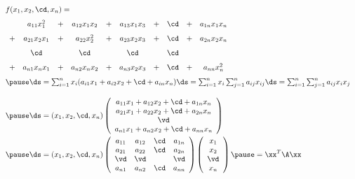 \begin{frame}
  \begin{footnotesize}
    $$
    \begin{array}{l}
      f(x_1,x_2,\cd,x_n) =  \\[0.1in]
      \begin{array}{rcccccccccc}
        &a_{11}x_1^2&+&a_{12}x_1x_2&+&a_{13}x_1x_3&+&\cd&+&a_{1n}x_1x_n\\[0.1in]
        +&a_{21}x_2x_1&+&a_{22}x_2^2&+&a_{23}x_2x_3&+&\cd&+&a_{2n}x_2x_n\\[0.1in]
        &\cd&&\cd&&\cd&&\cd\\[0.1in]
        +&a_{n1}x_nx_1&+&a_{n2}x_nx_2&+&a_{n3}x_2x_3&+&\cd&+&a_{nn}x_n^2
      \end{array} \\[0.5in] \pause
      \ds = \sum_{i=1}^nx_i(a_{i1}x_1+a_{i2}x_2+\cd+a_{in}x_n)
      \ds = \sum_{i=1}^nx_i\sum_{j=1}^n a_{ij}x_{ij}
      \ds = \sum_{i=1}^n\sum_{j=1}^na_{ij}x_ix_j\\[0.2in] \pause
      \ds = (x_1,x_2,\cd,x_n)\left(
      \begin{array}{c}
        a_{11}x_1+a_{12}x_2+\cd+a_{1n}x_n\\
        a_{21}x_1+a_{22}x_2+\cd+a_{2n}x_n\\
        \vd\\
        a_{n1}x_1+a_{n2}x_2+\cd+a_{nn}x_n
      \end{array}
      \right)\\[0.3in]\pause
      \ds = (x_1,x_2,\cd,x_n)\left(
      \begin{array}{cccc}
        a_{11}&a_{12}&\cd&a_{1n}\\
        a_{21}&a_{22}&\cd&a_{2n}\\
        \vd&\vd&&\vd\\
        a_{n1}&a_{n2}&\cd&a_{nn}\\
      \end{array}
      \right)\left(
      \begin{array}{c}
        x_1\\
        x_2\\
        \vd\\
        x_n
      \end{array}\right) \pause = \xx^T\A\xx
    \end{array}
    $$
  \end{footnotesize}
\end{frame}


